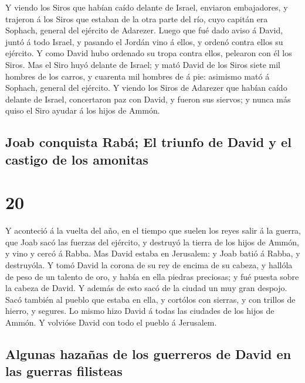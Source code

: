  Y viendo los Siros que habían caído delante de Israel,
enviaron embajadores, y trajeron á los Siros que estaban de la otra
parte del río, cuyo capitán era Sophach, general del ejército de
Adarezer.  Luego que fué dado aviso á David, juntó á todo
Israel, y pasando el Jordán vino á ellos, y ordenó contra ellos su
ejército. Y como David hubo ordenado su tropa contra ellos, pelearon con
él los Siros.  Mas el Siro huyó delante de Israel; y mató
David de los Siros siete mil hombres de los carros, y cuarenta mil
hombres de á pie: asimismo mató á Sophach, general del ejército.
 Y viendo los Siros de Adarezer que habían caído delante
de Israel, concertaron paz con David, y fueron sus siervos; y nunca más
quiso el Siro ayudar á los hijos de Ammón.

\hypertarget{joab-conquista-rabuxe1-el-triunfo-de-david-y-el-castigo-de-los-amonitas}{%
\subsection{Joab conquista Rabá; El triunfo de David y el castigo de los
amonitas}\label{joab-conquista-rabuxe1-el-triunfo-de-david-y-el-castigo-de-los-amonitas}}

\hypertarget{section-19}{%
\section{20}\label{section-19}}

 Y aconteció á la vuelta del año, en el tiempo que suelen
los reyes salir á la guerra, que Joab sacó las fuerzas del ejército, y
destruyó la tierra de los hijos de Ammón, y vino y cercó á Rabba. Mas
David estaba en Jerusalem: y Joab batió á Rabba, y destruyóla.
 Y tomó David la corona de su rey de encima de su cabeza,
y hallóla de peso de un talento de oro, y había en ella piedras
preciosas; y fué puesta sobre la cabeza de David. Y además de esto sacó
de la ciudad un muy gran despojo.  Sacó también al pueblo
que estaba en ella, y cortólos con sierras, y con trillos de hierro, y
segures. Lo mismo hizo David á todas las ciudades de los hijos de Ammón.
Y volvióse David con todo el pueblo á Jerusalem.

\hypertarget{algunas-hazauxf1as-de-los-guerreros-de-david-en-las-guerras-filisteas}{%
\subsection{Algunas hazañas de los guerreros de David en las guerras
filisteas}\label{algunas-hazauxf1as-de-los-guerreros-de-david-en-las-guerras-filisteas}}

